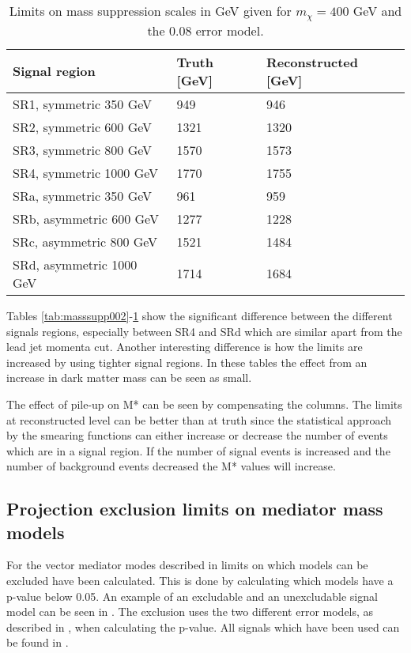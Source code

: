 \begin{table}[ht]
\begin{center}
\begin{tabular}{|l|l|l|}
\hline
Signal region & Truth [GeV]& Reconstructed [GeV]\\ \hline
SR1, symmetric 350 GeV&949&946\\
SR2, symmetric 600 GeV&1321&1320\\
SR3, symmetric 800 GeV&1570&1573\\
SR4, symmetric 1000 GeV&1770&1755\\ \hline

SRa, symmetric 350 GeV&961&959\\
SRb, asymmetric 600 GeV&1277&1228\\
SRc, asymmetric 800 GeV&1521&1484\\
SRd, asymmetric 1000 GeV&1714&1684\\ \hline
\end{tabular}
\caption{Limits on mass suppression scales in GeV given for $m_{\chi}=400$ GeV and the 0.08 error model.}
\label{tab:masssupp2010}
\end{center}
\end{table}

Tables \ref{tab:masssupp002}-\ref{tab:masssupp2010} show the significant difference between the different signals regions, especially between SR4 and SRd which are similar apart from the lead jet momenta cut. Another interesting difference is how the limits are increased by using tighter signal regions. In these tables the effect from an increase in dark matter mass can be seen as small.

The effect of pile-up on M* can be seen by compensating the columns. The limits at reconstructed level can be better than at truth since the statistical approach by the smearing functions can either increase or decrease the number of events which are in a signal region. If the number of signal events is increased and the number of background events decreased the M* values will increase.

\subsection{Projection exclusion limits on mediator mass models}\label{sec:res:subsec:Mm}
For the vector mediator modes described in  limits on which models can be excluded have been calculated. This is done by calculating which models have a p-value below 0.05. An example of an excludable and an unexcludable signal model can be seen in . The exclusion uses the two different error models, as described in , when calculating the p-value. All signals which have been used can be found in .

